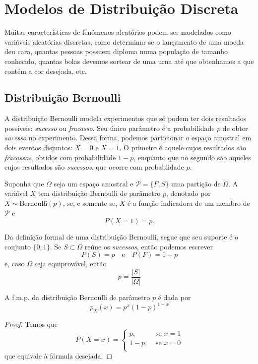 \section{Modelos de Distribuição Discreta}

Muitas características de fenômenos aleatórios podem ser modelados
como variáveis aleatórias discretas, como determinar se o lançamento
de uma moeda deu cara, quantas pessoas possuem diploma numa população
de tamanho conhecido, quantas bolas devemos sortear de uma urna até
que obtenhamos a que contém a cor desejada, etc.

\subsection{Distribuição Bernoulli}

A distribuição Bernoulli modela experimentos que só podem ter dois resultados
possíveis: \textit{sucesso} ou \textit{fracasso}. Seu único parâmetro é a probabilidade $p$
de obter \textit{sucesso} no experimento. Dessa forma, podemos particionar o espaço
amostral em dois eventos disjuntos: $X = 0$ e $X = 1$. O primeiro é aquele cujos
resultados são \textit{fracassos}, obtidos com probabilidade $1 - p$, enquanto que no
segundo são aqueles cujos resultados são \textit{sucessos}, que ocorre com probablidade
$p$.

\begin{def:bernoulli}
Suponha que $\Omega$ seja um espaço amostral e $\mathcal{P} = \{F, S\}$ uma partição de
$\Omega$. A variável $X$ tem distribuição Bernoulli de parâmetro $p$, denotado por
$X \sim \mathrm{Bernoulli}(p)$, se, e somente se, $X$ é a função indicadora de um membro
de $\mathcal{P}$ e
\[
	P(X = 1) = p.
\]
\end{def:bernoulli}

Da definição formal de uma distribuição Bernoulli, segue que seu suporte é o conjunto
$\{0, 1\}$. Se $S \subset \Omega$ reúne os \textit{sucessos}, então podemos escrever
\[
	P(S) = p \quad \text{e} \quad P(F) = 1 - p
\]
e, caso $\Omega$ seja equiprovável, então
\[
	p = \frac{|S|}{|\Omega|}
\]

\begin{prop:bernoulli}
A f.m.p. da distribuição Bernoulli de parâmetro $p$ é dada por
\[
	p_X(x) = p^x(1-p)^{1-x}
\]
\begin{proof}
	Temos que
	\[
		P(X = x) = \begin{cases}
			p,   & \text{ se } x = 1 \\
			1-p, & \text{ se } x = 0 \\
		\end{cases}
	\]
	que equivale à fórmula desejada.
\end{proof}
\end{prop:bernoulli}

